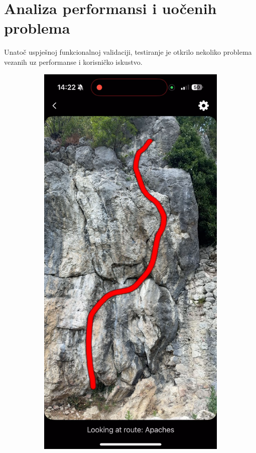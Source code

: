 \section{Analiza performansi i uočenih problema}

Unatoč uspješnoj funkcionalnoj validaciji, testiranje je otkrilo nekoliko problema vezanih uz performanse i korisničko iskustvo.

\begin{figure}[H]
    \centering
    \begin{subfigure}[b]{0.45\textwidth}
        \centering
        \includegraphics[width=\textwidth]{images/testiranje/apaches_latency_before.png}

\end{subfigure}
\end{figure}

